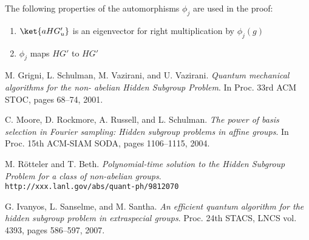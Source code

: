 \documentclass{article}
\begin{document}
The following properties of the automorphisms $\phi_j$ are used in the proof:
\begin{enumerate}
\item $\ket{aHG'_u}$ is an eigenvector for right multiplication by $\phi_j(g)$
\item $\phi_j$ maps $HG'$ to $HG'$
\end{enumerate}

\begin{thebibliography}{9}
	 M. Grigni, L. Schulman, M. Vazirani, and U. Vazirani. \textit{Quantum mechanical algorithms for the non- abelian Hidden Subgroup Problem}. In Proc. 33rd ACM STOC, pages 68–74, 2001.
	
	C. Moore, D. Rockmore, A. Russell, and L. Schulman. \textit{The power of basis selection in Fourier sampling: Hidden subgroup problems in affine groups}. In Proc. 15th ACM-SIAM SODA, pages 1106–1115, 2004.

    M. R{\"o}tteler and T. Beth.
	\textit{Polynomial-time solution to the Hidden Subgroup Problem for a class of non-abelian groups}. \\\texttt{http://xxx.lanl.gov/abs/quant-ph/9812070}
	
	G. Ivanyos, L. Sanselme, and M. Santha. \textit{An efficient quantum algorithm for the hidden subgroup problem in extraspecial groups}. Proc. 24th STACS, LNCS vol. 4393, pages 586–597, 2007.
	
	
\end{thebibliography}
\end{document}
